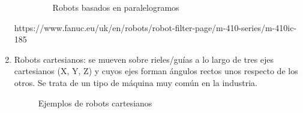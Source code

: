 \begin{enumerate}
\begin{itemize}
\begin{figure} [h!]
  \centering    
  \hspace{3cm}
  \caption{Robots basados en paralelogramos}
\end{figure}
\end{itemize}

https://www.fanuc.eu/uk/en/robots/robot-filter-page/m-410-series/m-410ic-185

\item Robots cartesianos: se mueven sobre rieles/guías a lo largo de tres ejes cartesianos (X, Y, Z) y cuyos ejes forman ángulos rectos unos respecto de 
los otros. Se trata de un tipo de máquina muy común en la industria.
\begin{figure} [h!]
  \centering    
  \hspace{1cm}
  \caption{Ejemplos de robots cartesianos}
\end{figure}


\end{enumerate}

